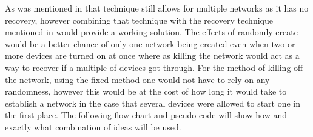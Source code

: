 \bigskip \noindent
As was mentioned in  that technique still allows for multiple networks as it has no recovery, however combining that technique with the recovery technique mentioned in  would provide a working solution.
The effects of randomly create would be a better chance of only one network being created even when two or more devices are turned on at once where as killing the network would act as a way to recover if a multiple of devices got through.
For the method of killing off the network, using the fixed method one would not have to rely on any randomness, however this would be at the cost of how long it would take to establish a network in the case that several devices were allowed to start one in the first place.
The following flow chart and pseudo code will show how and exactly what combination of ideas will be used.



